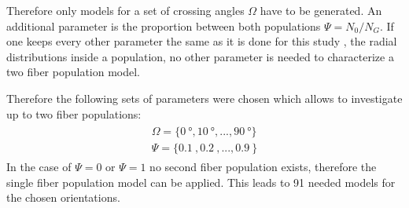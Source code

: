 Therefore only models for a set of crossing angles $\Omega$ have to be generated.
An additional parameter is the proportion between both populations $\Psi=N_0/N_G$.
If one keeps every other parameter the same as it is done for this study , \eg{} the radial distributions inside a population, no other parameter is needed to characterize a two fiber population model.
\par
% 
Therefore the following sets of parameters were chosen which allows to investigate up to two fiber populations:
\begin{align}
    \begin{split}
        \Omega = \{\SI{0}{\degree}, \SI{10}{\degree}, ..., \SI{90}{\degree}\}\\
        \Psi = \{\SI{0.1}{}, \SI{0.2}{}, ..., \SI{0.9}{}\}
    \end{split}
\end{align}
In the case of $\Psi = 0$ or $\Psi = 1$ no second fiber population exists, therefore the single fiber population model can be applied.
This leads to 91 needed models for the chosen orientations.
% 
